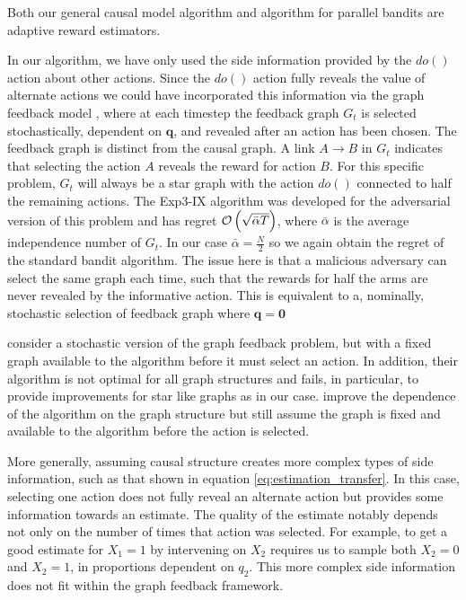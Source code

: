 Both our general causal model algorithm and algorithm for parallel bandits are adaptive reward estimators. 

In our algorithm, we have only used the side information provided by the $do()$ action about other actions. Since the $do()$ action fully reveals the value of alternate actions we could have incorporated this information via the graph feedback model \cite{Mannor2011}, where at each timestep the feedback graph $G_t$ is selected stochastically, dependent on $\boldsymbol{q}$, and revealed after an action has been chosen. The feedback graph is distinct from the causal graph. A link $A \rightarrow B$ in $G_t$ indicates that selecting the action $A$ reveals the reward for action $B$. For this specific problem, $G_t$ will always be a star graph with the action $do()$ connected to half the remaining actions. The Exp3-IX algorithm \cite{Kocak2014} was developed for the adversarial version of this problem and has regret $\mathcal{O}\left( \sqrt{\bar{\alpha}T} \right)$, where $\bar{\alpha}$ is the average independence number of $G_t$. In our case $\bar{\alpha} = \frac{N}{2}$ so we again obtain the regret of the standard bandit algorithm. The issue here is that a malicious adversary can select the same graph each time, such that the rewards for half the arms are never revealed by the informative action. This is equivalent to a, nominally, stochastic selection of feedback graph where $\boldsymbol{q} = \boldsymbol{0}$


% 

\cite{Lelarge2012} consider a stochastic version of the graph feedback problem, but with a fixed graph available to the algorithm before it must select an action. In addition, their algorithm is not optimal for all graph structures and fails, in particular, to provide improvements for star like graphs as in our case. \cite{Buccapatnam2014} improve the dependence of the algorithm on the graph structure but still assume the graph is fixed and available to the algorithm before the action is selected. 

More generally, assuming causal structure creates more complex types of side information, such as that shown in equation \ref{eq:estimation_transfer}. In this case, selecting one action does not fully reveal an alternate action but provides some information towards an estimate. The quality of the estimate notably depends not only on the number of times that action was selected. For example, to get a good estimate for $X_1 = 1$ by intervening on $X_2$ requires us to sample both $X_2=0$ and $X_2=1$, in proportions dependent on $q_2$. This more complex side information does not fit within the graph feedback framework.


